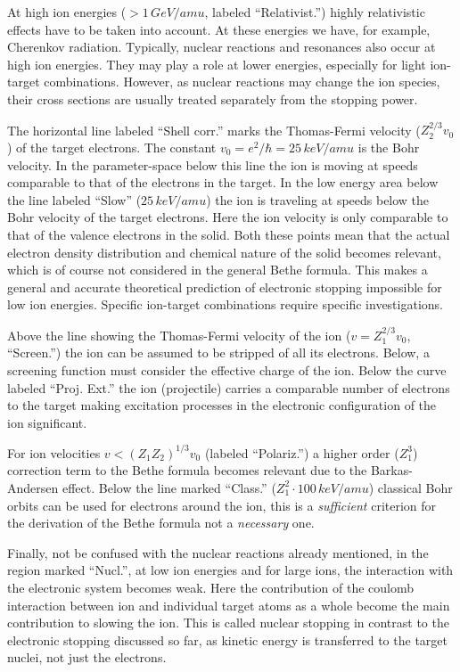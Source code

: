 At high ion energies ($ > 1\,GeV/amu$, labeled ``Relativist.'') highly relativistic effects have to be taken into account. At these energies we have, for example, Cherenkov radiation. Typically, nuclear reactions and resonances also occur at high ion energies. They may play a role at lower energies, especially for light ion-target combinations. However, as nuclear reactions may change the ion species, their cross sections are usually treated separately from the stopping power.

The horizontal line labeled ``Shell corr.'' marks the Thomas-Fermi velocity ($Z_2^{2/3}v_0$) of the target electrons. The constant $v_0 = e^2/\hbar = 25\,keV/amu$ is the Bohr velocity. In the parameter-space below this line the ion is moving at speeds comparable to that of the electrons in the target. In the low energy area below the line labeled ``Slow'' ($25\,keV/amu$) the ion is traveling at speeds below the Bohr velocity of the target electrons. Here the ion velocity is only comparable to that of the valence electrons in the solid. Both these points mean that the actual electron density distribution and chemical nature of the solid becomes relevant, which is of course not considered in the general Bethe formula. This makes a general and accurate theoretical prediction of electronic stopping impossible for low ion energies. Specific ion-target combinations require specific investigations.

Above the line showing the Thomas-Fermi velocity of the ion ($v = Z_1^{2/3}v_0$, ``Screen.'') the ion can be assumed to be stripped of all its electrons. Below, a screening function must consider the effective charge of the ion. Below the curve labeled ``Proj. Ext.'' the ion (projectile) carries a comparable number of electrons to the target making excitation processes in the electronic configuration of the ion significant.

For ion velocities $v < (Z_1Z_2)^{1/3}v_0$ (labeled ``Polariz.'') a higher order ($Z_1^3$) correction term to the Bethe formula becomes relevant due to the Barkas-Andersen effect. Below the line marked ``Class.'' ($Z_1^2\cdot 100\,keV/amu$) classical Bohr orbits can be used for electrons around the ion, this is a \emph{sufficient} criterion for the derivation of the Bethe formula not a \emph{necessary} one.

Finally, not be confused with the nuclear reactions already mentioned, in the region marked ``Nucl.'', at low ion energies and for large ions, the interaction with the electronic system becomes weak. Here the contribution of the coulomb interaction between ion and individual target atoms as a whole become the main contribution to slowing the ion. This is called nuclear stopping in contrast to the electronic stopping discussed so far, as kinetic energy is transferred to the target nuclei, not just the electrons.

